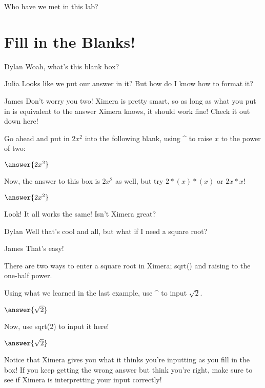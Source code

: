 \documentclass{ximera}
\begin{document}
\begin{question}
Who have we met in this lab?
\begin{selectAll}
\end{selectAll}
\end{question}

\section{Fill in the Blanks!}
\begin{dialogue}
\item[Dylan] Woah, what's this blank box?
\item[Julia] Looks like we put our answer in it? But how do I know how to format it?
\item[James] Don't worry you two! Ximera is pretty smart, so as long as what you put in is equivalent to the answer Ximera knows, it should work fine! Check it out down here!
\end{dialogue}

\begin{question}
Go ahead and put in $2x^2$ into the following blank, using \^ \; to raise $x$ to the power of two:

$\answer{2x^2}$

Now, the answer to this box is $2x^2$ as well, but try $2*(x)*(x)$ or $2x*x$!

$\answer{2x^2}$
\begin{feedback}[correct]
Look! It all works the same! Isn't Ximera great?
\end{feedback}
\end{question}

\begin{dialogue}
\item[Dylan] Well that's cool and all, but what if I need a square root?
\item[James] That's easy!
\end{dialogue}

There are two ways to enter a square root in Ximera; sqrt() and raising to the one-half power.

\begin{question}
Using what we learned in the last example, use \^ \; to input $\sqrt{2}$.

$\answer{\sqrt{2}}$

Now, use sqrt(2) to input it here!

$\answer{\sqrt{2}}$
\begin{feedback}[correct]
Notice that Ximera gives you what it thinks you're inputting as you fill in the box! If you keep getting the wrong answer but think you're right, make sure to see if Ximera is interpretting your input correctly!
\end{feedback}
\end{question}
\end{document}
